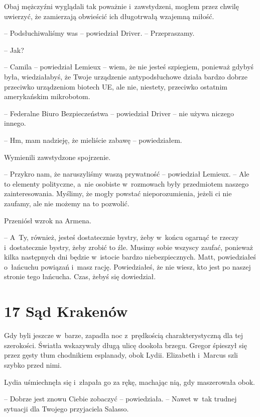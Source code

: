 \documentclass[oneside,polish,12pt,sfheadings]{mwbk}
\begin{document}
Obaj mężczyźni wyglądali tak poważnie i~zawstydzeni, mogłem przez chwilę
uwierzyć, że zamierzają obwieścić ich długotrwałą wzajemną miłość.

-- Podsłuchiwaliśmy was -- powiedział Driver. -- Przepraszamy.

-- Jak?

-- Camila -- powiedział Lemieux -- wiem, że nie jesteś szpiegiem, ponieważ
gdybyś była, wiedziałabyś, że Twoje urządzenie antypodsłuchowe działa
bardzo dobrze przeciwko urządzeniom biotech UE, ale nie, niestety,
przeciwko ostatnim amerykańskim mikrobotom.

-- Federalne Biuro Bezpieczeństwa -- powiedział Driver -- nie używa niczego
innego.

-- Hm, mam nadzieję, że mieliście zabawę -- powiedziałem.

Wymienili zawstydzone spojrzenie.

-- Przykro nam, że naruszyliśmy waszą prywatność -- powiedział Lemieux. --
Ale to elementy polityczne, a~nie osobiste w~rozmowach były przedmiotem
naszego zainteresowania. Myślimy, że mogły powstać nieporozumienia,
jeżeli ci nie zaufamy, ale nie możemy na to pozwolić.

Przeniósł wzrok na Armena. 

-- A~Ty, również, jesteś dostatecznie bystry,
żeby w~końcu ogarnąć te rzeczy i~dostatecznie bystry, żeby zrobić to
źle. Musimy sobie wszyscy zaufać, ponieważ kilka następnych dni będzie w~istocie bardzo niebezpiecznych. Matt, powiedziałeś o~łańcuchu powiązań i~masz rację. Powiedziałeś, że nie wiesz, kto jest po naszej stronie tego
łańcucha. Czas, żebyś się dowiedział.


\chapter[Sąd Krakenów]{17 Sąd Krakenów}





Gdy byli jeszcze w~barze, zapadła noc z~prędkością charakterystyczną dla
tej szerokości. Światła wskazywały długą ulicę dookoła brzegu. Gregor
śpieszył się przez gęsty tłum chodnikiem esplanady, obok Lydii.
Elizabeth i~Marcus szli szybko przed nimi.

Lydia uśmiechnęła się i~złapała go za rękę, machając nią, gdy
maszerowała obok.

-- Dobrze jest znowu Ciebie zobaczyć -- powiedziała. -- Nawet w~tak trudnej
sytuacji dla Twojego przyjaciela Salasso.
\end{document}
